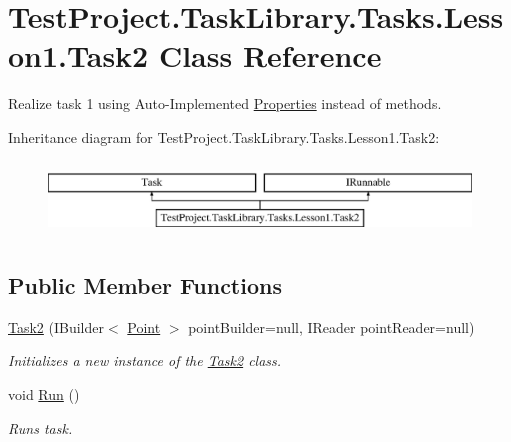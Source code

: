\hypertarget{class_test_project_1_1_task_library_1_1_tasks_1_1_lesson1_1_1_task2}{}\section{Test\+Project.\+Task\+Library.\+Tasks.\+Lesson1.\+Task2 Class Reference}
\label{class_test_project_1_1_task_library_1_1_tasks_1_1_lesson1_1_1_task2}


Realize task 1 using Auto-\/\+Implemented \mbox{\hyperlink{namespace_test_project_1_1_task_library_1_1_properties}{Properties}} instead of methods.  


Inheritance diagram for Test\+Project.\+Task\+Library.\+Tasks.\+Lesson1.\+Task2\+:\begin{figure}[H]
\begin{center}
\leavevmode
\includegraphics[height=2.000000cm]{class_test_project_1_1_task_library_1_1_tasks_1_1_lesson1_1_1_task2}
\end{center}
\end{figure}
\subsection*{Public Member Functions}
\begin{DoxyCompactItemize}
\item 
\mbox{\hyperlink{class_test_project_1_1_task_library_1_1_tasks_1_1_lesson1_1_1_task2_a030b8c932ff7ce65221fe4e088725c57}{Task2}} (I\+Builder$<$ \mbox{\hyperlink{class_test_project_1_1_task_library_1_1_tasks_1_1_lesson1_1_1_models_1_1_point}{Point}} $>$ point\+Builder=null, I\+Reader point\+Reader=null)
\begin{DoxyCompactList}\small\item\em Initializes a new instance of the \mbox{\hyperlink{class_test_project_1_1_task_library_1_1_tasks_1_1_lesson1_1_1_task2}{Task2}} class. \end{DoxyCompactList}\item 
void \mbox{\hyperlink{class_test_project_1_1_task_library_1_1_tasks_1_1_lesson1_1_1_task2_ad1a729069ea2544206e86b89a0db8efa}{Run}} ()
\begin{DoxyCompactList}\small\item\em Runs task. \end{DoxyCompactList}\end{DoxyCompactItemize}



